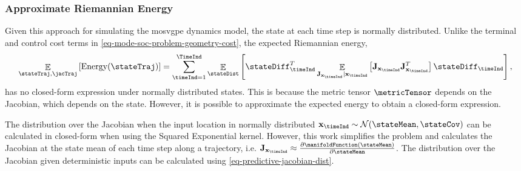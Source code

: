 \documentclass{mimosis-class/mimosis}
\numberwithin{equation}{chapter}
\DeclareMathOperator{\E}{\mathbb{E}}
\newcommand{\state}{\ensuremath{\mathbf{x}}}
\newcommand{\Jac}{\ensuremath{\mathbf{J}}}
\begin{document}
{\subsubsection{Approximate Riemannian Energy}
\label{sec:org0e02873}
Given this approach for simulating the \acrshort{mosvgpe} dynamics model, the state at each time step is normally distributed.
Unlike the terminal and control cost terms in \cref{eq-mode-soc-problem-geometry-cost}, the expected Riemannian
energy,
\begin{align} \label{eq-trajectory-riemannian-energy}
\E_{\stateTraj, \jacTraj} \left[ \text{Energy}(\stateTraj) \right]
= \sum_{\timeInd=1}^\TimeInd
\E_{\stateDist}\left[ \stateDiff_\timeInd^T
\E_{\Jac_{\state_{\timeInd}} \mid \state_{\timeInd}}\left[ \Jac_{\state_\timeInd} \Jac_{\state_\timeInd}^T \right]
 \stateDiff_\timeInd \right],
\end{align}
has no closed-form expression under normally distributed states.
This is because the metric tensor \(\metricTensor\) depends on the Jacobian, which depends on the state.
However, it is possible to approximate the expected energy to obtain a closed-form expression.

The distribution over the Jacobian when the input location in normally distributed
\(\state_{\timeInd} \sim \mathcal{N}(\stateMean, \stateCov)\) can be calculated in closed-form when using the
Squared Exponential kernel.
However, this work simplifies the problem and calculates the Jacobian at the state mean of each time step
along a trajectory, i.e.
\(\Jac_{\state_{\timeInd}} \approx \frac{\partial \manifoldFunction(\stateMean)}{\partial \stateMean}\).
The distribution over the Jacobian given deterministic inputs can be calculated using \cref{eq-predictive-jacobian-dist}.

}
\end{document}
